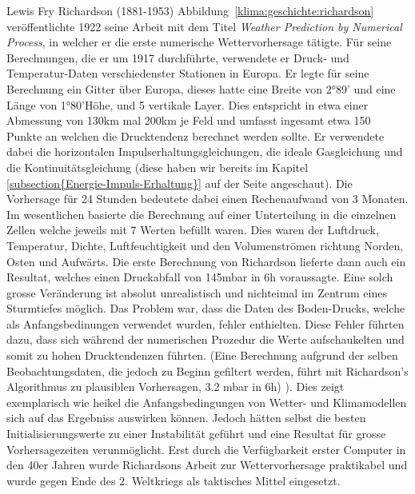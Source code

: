 \begin{refsection}
Lewis Fry Richardson (1881-1953) Abbildung~\ref{klima:geschichte:richardson} veröffentlichte 1922 seine Arbeit mit dem Titel {\em Weather Prediction by Numerical Process}, in welcher er die erste numerische Wettervorhersage tätigte.
Für seine Berechnungen, die er um 1917 durchführte, verwendete er Druck- und Temperatur-Daten verschiedenster Stationen in Europa. Er legte für seine Berechnung ein Gitter über Europa, dieses hatte eine Breite von 2°89' und eine Länge von 1°80'Höhe, und 5 vertikale Layer. Dies entspricht in etwa einer Abmessung von 130km mal 200km je Feld und umfasst ingesamt etwa 150 Punkte an welchen die Drucktendenz berechnet werden sollte. Er verwendete dabei die horizontalen Impulserhaltungsgleichungen, die ideale Gasgleichung und die Kontinuitätsgleichung (diese haben wir bereits im Kapitel \ref{subsection{Energie-Impuls-Erhaltung}}  auf der Seite  angeschaut). Die Vorhersage für 24 Stunden bedeutete dabei einen Rechenaufwand von 3 Monaten.
Im wesentlichen basierte die Berechnung auf einer Unterteilung in die einzelnen Zellen welche jeweils mit 7 Werten befüllt waren. Dies waren der Luftdruck, Temperatur, Dichte, Luftfeuchtigkeit und den Volumenströmen richtung Norden, Osten und Aufwärts.
Die erste Berechnung von Richardson lieferte dann auch ein Resultat, welches einen Druckabfall von 145mbar in 6h voraussagte. Eine solch grosse Veränderung ist absolut unrealistisch und nichteimal im Zentrum eines Sturmtiefes möglich. Das Problem war, dass die Daten des Boden-Drucks, welche als Anfangsbedinungen verwendet wurden, fehler enthielten. Diese Fehler führten dazu, dass sich während der numerischen Prozedur die Werte aufschaukelten und somit zu hohen Drucktendenzen führten. (Eine Berechnung aufgrund der selben Beobachtungsdaten, die jedoch zu Beginn gefiltert werden, führt mit Richardson's Algorithmus zu plausiblen Vorhersagen, 3.2 mbar in 6h) \cite{klima:stocker}).
Dies zeigt exemplarisch wie heikel die Anfangsbedingungen von Wetter- und Klimamodellen sich auf das Ergebniss auswirken können. Jedoch hätten selbst die besten Initialisierungswerte zu einer Instabilität geführt und eine Resultat für grosse Vorhersagezeiten verunmöglicht.
Erst durch die Verfügbarkeit erster Computer in den 40er Jahren wurde Richardsons Arbeit zur  Wettervorhersage praktikabel und wurde gegen Ende des 2. Weltkriegs als taktisches Mittel eingesetzt.


\end{refsection}
